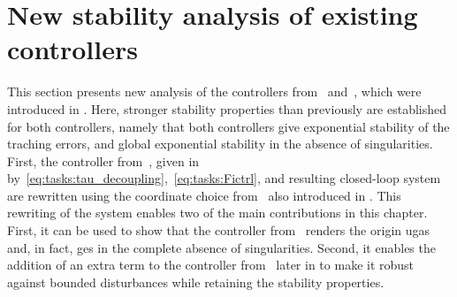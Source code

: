 \documentclass[../main.tex]{subfiles}
\begin{document}
\section{New stability analysis of existing controllers}\label{sec:comp:analysis}






This section presents new analysis of the controllers from~\cite{Saeboe2022} and~\cite{Garofalo2020}, which were introduced in . Here, stronger stability properties than previously are established for both controllers, namely that both controllers give exponential stability of the traching errors, and global exponential stability in the absence of singularities.
First, the controller from~\cite{Saeboe2022}, given in  by~\eqref{eq:tasks:tau_decoupling},~\eqref{eq:tasks:Fictrl}, and resulting closed-loop system are rewritten using the coordinate choice from~\cite{Garofalo2020} also introduced in . This rewriting of the system enables two of the main contributions in this chapter. First, it can be used to show that the controller from~\cite{Saeboe2022} renders the origin \gls{ugas} and, in fact, \gls{ges} in the complete absence of singularities. Second, it enables the addition of an extra term to the controller from~\cite{Saeboe2022} later in  to make it robust against bounded disturbances while retaining the stability properties.
\end{document}
